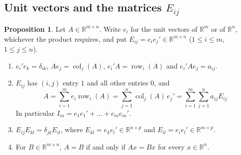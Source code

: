 \documentclass[12pt]{article}
\newcommand{\R}{\mathbb R}
\DeclareMathOperator{\row}{row}
\DeclareMathOperator{\col}{col}
\theoremstyle{definition}
\newtheorem{proposition}[theorem]{Proposition}
\begin{document}
\subsection*{Unit vectors and the matrices \(E_{ij}\)}

\begin{proposition}\label{r1-prop-units}
Let \(A\in\R^{m\times n}\). Write \(e_i\) for the unit vectors of \(\R^m\) or of \(\R^n\), whichever the product
requires, and put \(E_{ij}=e_ie_j'\in\R^{m\times n}\) (\(1\leqslant i\leqslant m\), \(1\leqslant j\leqslant n\)).
\begin{enumerate}
\item \(e_i'e_k=\delta_{ik}\), \(Ae_j=\col_j(A)\), \(e_i'A=\row_i(A)\) and \(e_i'Ae_j=a_{ij}\).
\item \(E_{ij}\) has \((i,j)\) entry \(1\) and all other entries \(0\), and
\[
A=\sum_{i=1}^me_i\row_i(A)=\sum_{j=1}^n\col_j(A)\,e_j'=\sum_{i=1}^m\sum_{j=1}^na_{ij}E_{ij}
\]
In particular \(I_m=e_1e_1'+\dots+e_me_m'\).
\item \(E_{ij}E_{kl}=\delta_{jk}E_{il}\), where \(E_{kl}=e_ke_l'\in\R^{n\times p}\) and \(E_{il}=e_ie_l'\in\R^{m\times p}\).
\item For \(B\in\R^{m\times n}\), \(A=B\) if and only if \(Ax=Bx\) for every \(x\in\R^n\).
\end{enumerate}
\end{proposition}
\end{document}

